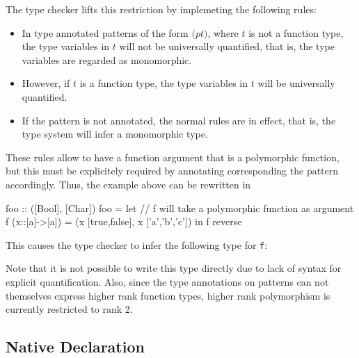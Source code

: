 The \frege{} type checker lifts this restriction by implemeting the following rules:
\begin{itemize}
\item In type annotated patterns of the form $(p$\sym{::}$t)$, where $t$ is not a function type, the type variables in $t$ will not be universally quantified, that is, the type variables are regarded as monomorphic.
\item However, if $t$ is a function type, the type variables in $t$ will be universally quantified.
\item If the pattern is not annotated, the normal rules are in effect, that is, the type system will infer a monomorphic type.
\end{itemize}
These rules allow to have a function argument that is a polymorphic function, but this must be explicitely required by annotating corresponding the pattern accordingly.
Thus, the example above can be rewritten in \frege{}

\begin{code}
foo :: ([Bool], [Char])
foo = let
        // f will take a polymorphic function as argument
        f (x::[a]->[a]) = (x [true,false], x ['a','b','c'])
    in f reverse
\end{code}

This causes the type checker to infer the following type for \texttt{f}: 

Note that it is not possible to write this type directly due to lack of syntax for explicit quantification. Also, since the type annotations on patterns can not themselves express higher rank function types, higher rank polymorphism is currently restricted to rank 2.


\subsection{Native Declaration} \label{nativefun}

\begin{flushleft}
    \sym{::} \\
  \oder{}  \oder{}  \oder{} 
\end{flushleft}

